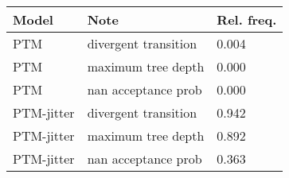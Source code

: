 
\begin{tabu} to 
\toprule
Model & Note & Rel. freq.\\
\midrule
PTM & divergent transition & 0.004\\
PTM & maximum tree depth & 0.000\\
PTM & nan acceptance prob & 0.000\\
\addlinespace
PTM-jitter & divergent transition & 0.942\\
PTM-jitter & maximum tree depth & 0.892\\
PTM-jitter & nan acceptance prob & 0.363\\
\bottomrule
\end{tabu}